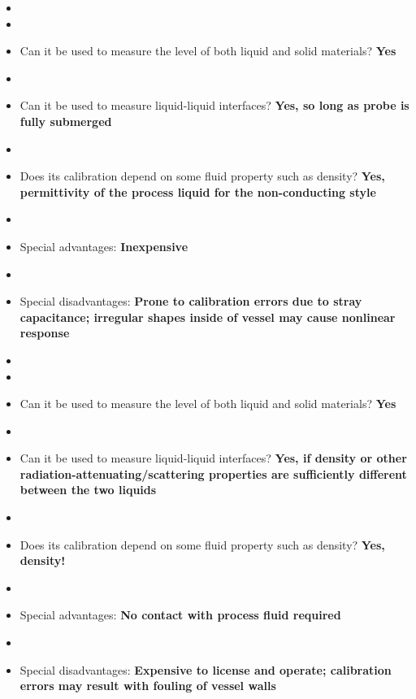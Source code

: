 \begin{itemize}
\goodbreak
\item{} 
\item\item{} Can it be used to measure the level of both liquid and solid materials? {\bf Yes}
\item\item{} Can it be used to measure liquid-liquid interfaces? {\bf Yes, so long as probe is fully submerged}
\item\item{} Does its calibration depend on some fluid property such as density? {\bf Yes, permittivity of the process liquid for the non-conducting style}
\item\item{} Special advantages: {\bf Inexpensive}
\item\item{} Special disadvantages: {\bf Prone to calibration errors due to stray capacitance; irregular shapes inside of vessel may cause nonlinear response}
\end{itemize}

\vskip 10pt

\begin{itemize}
\goodbreak
\item{} 
\item\item{} Can it be used to measure the level of both liquid and solid materials? {\bf Yes}
\item\item{} Can it be used to measure liquid-liquid interfaces? {\bf Yes, if density or other radiation-attenuating/scattering properties are sufficiently different between the two liquids}
\item\item{} Does its calibration depend on some fluid property such as density? {\bf Yes, density!}
\item\item{} Special advantages: {\bf No contact with process fluid required}
\item\item{} Special disadvantages: {\bf Expensive to license and operate; calibration errors may result with fouling of vessel walls}
\end{itemize}













